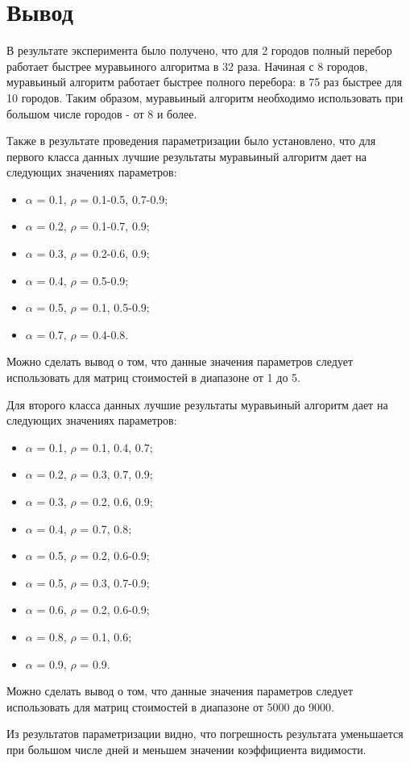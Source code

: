 \section{Вывод}

В результате эксперимента было получено, что для 2 городов полный перебор работает быстрее муравьиного алгоритма в 32 раза. Начиная с 8 городов, муравьиный алгоритм работает быстрее полного перебора: в 75 раз быстрее для 10 городов. Таким образом, муравьиный алгоритм необходимо использовать при большом числе городов - от 8 и более.

Также в результате проведения параметризации было установлено, что для первого класса данных лучшие результаты муравьиный алгоритм дает на следующих значениях параметров:
\begin{itemize}
	\item $\alpha$ = 0.1, $\rho$ = 0.1-0.5, 0.7-0.9;
	\item $\alpha$ = 0.2, $\rho$ = 0.1-0.7, 0.9;
	\item $\alpha$ = 0.3, $\rho$ = 0.2-0.6, 0.9;
	\item $\alpha$ = 0.4, $\rho$ = 0.5-0.9;
	\item $\alpha$ = 0.5, $\rho$ = 0.1, 0.5-0.9;
	\item $\alpha$ = 0.7, $\rho$ = 0.4-0.8.
\end{itemize}

Можно сделать вывод о том, что данные значения параметров следует использовать для матриц стоимостей в диапазоне от 1 до 5.

Для второго класса данных лучшие результаты муравьиный алгоритм дает на следующих значениях параметров:
\begin{itemize}
	\item $\alpha$ = 0.1, $\rho$ = 0.1, 0.4, 0.7;
	\item $\alpha$ = 0.2, $\rho$ = 0.3, 0.7, 0.9;
	\item $\alpha$ = 0.3, $\rho$ = 0.2, 0.6, 0.9;
	\item $\alpha$ = 0.4, $\rho$ = 0.7, 0.8;
	\item $\alpha$ = 0.5, $\rho$ = 0.2, 0.6-0.9;
	\item $\alpha$ = 0.5, $\rho$ = 0.3, 0.7-0.9;
	\item $\alpha$ = 0.6, $\rho$ = 0.2, 0.6-0.9;
	\item $\alpha$ = 0.8, $\rho$ = 0.1, 0.6;
	\item $\alpha$ = 0.9, $\rho$ = 0.9.
\end{itemize}

Можно сделать вывод о том, что данные значения параметров следует использовать для матриц стоимостей в диапазоне от 5000 до 9000.

Из результатов параметризации видно, что погрешность результата уменьшается при большом числе дней и меньшем значении коэффициента видимости.